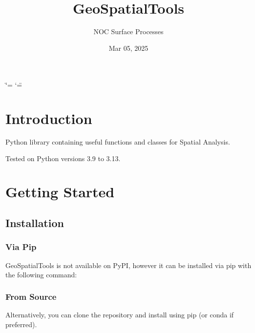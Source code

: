 \documentclass[letterpaper,10pt,english]{sphinxmanual}
\title{GeoSpatialTools}
\date{Mar 05, 2025}
\author{NOC Surface Processes}
\begin{document}
\ifdefined\shorthandoff
  \ifnum\catcode`\=\string=\active\shorthandoff{=}\fi
  \ifnum\catcode`\"=\active{}\fi
\fi

\pagestyle{empty}
\sphinxmaketitle
\pagestyle{plain}
\sphinxtableofcontents
\pagestyle{normal}
\label{\detokenize{index::doc}}


\sphinxstepscope


\chapter{Introduction}
\label{\detokenize{introduction:introduction}}\label{\detokenize{introduction::doc}}
\sphinxAtStartPar
Python library containing useful functions and classes for Spatial Analysis.

\sphinxAtStartPar
Tested on Python versions 3.9 to 3.13.

\sphinxstepscope


\chapter{Getting Started}
\label{\detokenize{getting_started:getting-started}}\label{\detokenize{getting_started::doc}}

\section{Installation}
\label{\detokenize{getting_started:installation}}

\subsection{Via Pip}
\label{\detokenize{getting_started:via-pip}}
\sphinxAtStartPar
GeoSpatialTools is not available on PyPI, however it can be installed via pip with the following command:

\begin{sphinxVerbatim}[commandchars=\\\{\}]
\end{sphinxVerbatim}


\subsection{From Source}
\label{\detokenize{getting_started:from-source}}
\sphinxAtStartPar
Alternatively, you can clone the repository and install using pip (or conda if preferred).
\end{document}
